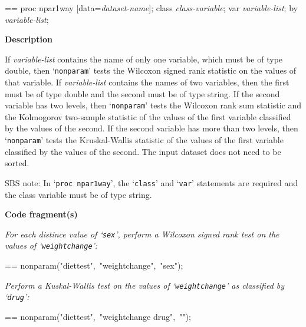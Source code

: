 \documentclass{book}
\makeatletter
\newcommand\Texinfocommandstyletextvar[1]{{\normalfont{}\textsl{#1}}}%
\newenvironment{Texinfopreformatted}{%
  \par\GNUTobeylines\obeyspaces\frenchspacing\parskip=\z@\parindent=\z@}{}
{\catcode`\^^M=13 \gdef\GNUTobeylines{\catcode`\^^M=13 \def^^M{\null\par}}}
\newenvironment{Texinfoindented}{\begin{list}{}{}\item\relax}{\end{list}}
\renewcommand{\_}{\Texinfounderscore\discretionary{}{}{}}
\makeatother
\begin{document}
\begin{Texinfoindented}
\begin{Texinfopreformatted}%
proc npar1way [data=\Texinfocommandstyletextvar{dataset-name}];
class \Texinfocommandstyletextvar{class-variable};
var \Texinfocommandstyletextvar{variable-list};
by \Texinfocommandstyletextvar{variable-list};

\end{Texinfopreformatted}
\end{Texinfoindented}

%

\noindent{}\textbf{Description}

If \Texinfocommandstyletextvar{variable-list} contains the name of only one variable,
which must be of type double, then `\texttt{nonparam}'
tests the Wilcoxon signed rank statistic on the values of that variable.
If \Texinfocommandstyletextvar{variable-list}
contains the names of two variables, then the first must be of type double
and the second must be of type string.
If the second variable has two levels, then
`\texttt{nonparam}' tests the Wilcoxon rank sum statistic
and the Kolmogorov two-sample statistic of the values
of the first variable classified by the values of the second.
If the second variable has more than two levels, then
`\texttt{nonparam}' tests the Kruskal-Wallis statistic of the values
of the first variable classified by the values of the second.
The input dataset does not need to be sorted.

SBS note: In `\texttt{proc npar1way}', the `\texttt{class}' and `\texttt{var}' statements are required
and the class variable must be of type string.

\noindent{}\textbf{Code fragment(s)}

\emph{For each distince value of `\texttt{sex}',
perform a Wilcoxon signed rank test on the values of `\texttt{weightchange}':}
\begin{Texinfoindented}
\begin{Texinfopreformatted}%
\ttfamily nonparam("diettest",\ "weightchange",\ "sex");
\end{Texinfopreformatted}
\end{Texinfoindented}

\emph{Perform a Kuskal-Wallis test on the values of `\texttt{weightchange}'
as classified by `\texttt{drug}':}
\begin{Texinfoindented}
\begin{Texinfopreformatted}%
\ttfamily nonparam("diettest",\ "weightchange drug",\ "");
\end{Texinfopreformatted}
\end{Texinfoindented}
%
%
%
%
%
%
%
\end{document}
